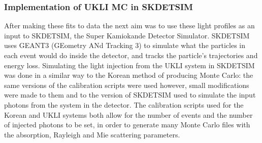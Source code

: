 \begin{figure}[!htbp]
    
\end{figure}


\subsubsection{Implementation of UKLI MC in SKDETSIM}
After making these fits to data the next aim was to use these light profiles as an input to SKDETSIM, the Super Kamiokande Detector Simulator. SKDETSIM uses GEANT3 (GEometry ANd Tracking 3) to simulate what the particles in each event would do inside the detector, and tracks the particle's trajectories and energy loss. Simulating the light injection from the UKLI system in SKDETSIM was done in a similar way to the Korean method of producing Monte Carlo: the same versions of the calibration scripts were used however, small modifications were made to them and to the version of SKDETSIM used to simulate the input photons from the system in the detector. The calibration scripts used for the Korean and UKLI systems both allow for the number of events and the number of injected photons to be set, in order to generate many Monte Carlo files with the absorption, Rayleigh and Mie scattering parameters. 
\newline
